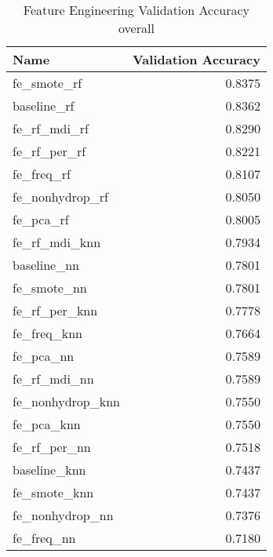 \begin{table}[H]
    \begin{center}
        \caption{Feature Engineering Validation Accuracy \\ overall}
        \begin{tabular}{lr}
            \toprule
            Name               & Validation Accuracy \\
            \midrule
            fe\_smote\_rf      & 0.8375              \\
            baseline\_rf       & 0.8362              \\
            fe\_rf\_mdi\_rf    & 0.8290              \\
            fe\_rf\_per\_rf    & 0.8221              \\
            fe\_freq\_rf       & 0.8107              \\
            fe\_nonhydrop\_rf  & 0.8050              \\
            fe\_pca\_rf        & 0.8005              \\
            fe\_rf\_mdi\_knn   & 0.7934              \\
            baseline\_nn       & 0.7801              \\
            fe\_smote\_nn      & 0.7801              \\
            fe\_rf\_per\_knn   & 0.7778              \\
            fe\_freq\_knn      & 0.7664              \\
            fe\_pca\_nn        & 0.7589              \\
            fe\_rf\_mdi\_nn    & 0.7589              \\
            fe\_nonhydrop\_knn & 0.7550              \\
            fe\_pca\_knn       & 0.7550              \\
            fe\_rf\_per\_nn    & 0.7518              \\
            baseline\_knn      & 0.7437              \\
            fe\_smote\_knn     & 0.7437              \\
            fe\_nonhydrop\_nn  & 0.7376              \\
            fe\_freq\_nn       & 0.7180              \\
            \bottomrule
        \end{tabular}
    \end{center}
\end{table}


